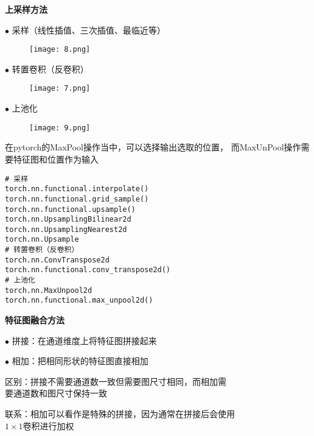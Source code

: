 \begin{frame}
    \noindent\large\textbf{上采样方法}
    \vspace{1em}

    $\bullet$ 采样（线性插值、三次插值、最临近等）

    \begin{figure}
        \texttt{[image: 8.png]}
    \end{figure}

    $\bullet$ 转置卷积（反卷积）
    \begin{figure}
        \texttt{[image: 7.png]}
    \end{figure}

\end{frame}

\begin{frame}
    $\bullet$ 上池化

    \begin{figure}
        \texttt{[image: 9.png]}
    \end{figure}

    \vspace{1em}
    在pytorch的MaxPool操作当中，可以选择输出选取的位置，
    而MaxUnPool操作需要特征图和位置作为输入
\end{frame}

\begin{frame}[fragile]
    \begin{lstlisting}
# 采样
torch.nn.functional.interpolate()
torch.nn.functional.grid_sample()
torch.nn.functional.upsample()
torch.nn.UpsamplingBilinear2d
torch.nn.UpsamplingNearest2d
torch.nn.Upsample
# 转置卷积（反卷积）
torch.nn.ConvTranspose2d
torch.nn.functional.conv_transpose2d()
# 上池化
torch.nn.MaxUnpool2d
torch.nn.functional.max_unpool2d()
    \end{lstlisting}
\end{frame}

\begin{frame}

    \vspace{-5em}
    \noindent\large\textbf{特征图融合方法}


    \normalsize
    \vspace{1em}
    $\bullet$ 拼接：在通道维度上将特征图拼接起来

    \vspace{1em}
    $\bullet$ 相加：把相同形状的特征图直接相加

    \vspace{1em}
    区别：拼接不需要通道数一致但需要图尺寸相同，而相加需\\
    \quad \quad \quad 要通道数和图尺寸保持一致

    \vspace{1em}
    联系：相加可以看作是特殊的拼接，因为通常在拼接后会使用\\
    \quad \quad \quad$1\times1$卷积进行加权

\end{frame}

